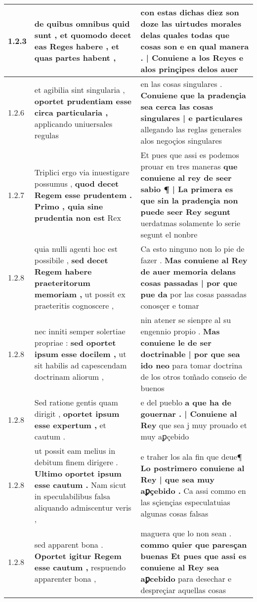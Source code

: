 \begin{tabular}{|p{1cm}|p{6.5cm}|p{6.5cm}|}
1.2.3 & de quibus omnibus quid sunt , \textbf{ et quomodo decet eas Reges habere , } et quas partes habent , & con estas dichas diez \textbf{ son doze las uirtudes morales delas quales todas que cosas son e en qual manera . | Conuiene a los Reyes } e alos prinçipes delos auer \\\hline
1.2.6 & et agibilia sint singularia , \textbf{ oportet prudentiam esse circa particularia , } applicando uniuersales regulas & en las cosas singulares . \textbf{ Conuiene que la pradençia sea cerca las cosas singulares | e particulares } allegando las reglas generales alos negoçios singulares \\\hline
1.2.7 & Triplici ergo via inuestigare possumus , \textbf{ quod decet Regem esse prudentem . Primo , quia sine prudentia non est } Rex & Et pues que assi es podemos prouar en tres maneras \textbf{ que conuiene al rey de seer sabio ¶ | La primera es que sin la pradençia non puede seer Rey segunt } uerdatmas solamente lo serie segunt el nonbre \\\hline
1.2.8 & quia nulli agenti hoc est possibile , \textbf{ sed decet Regem habere praeteritorum memoriam , } ut possit ex praeteritis cognoscere , & Ca esto ninguno non lo pie de fazer . \textbf{ Mas conuiene al Rey de auer memoria delans cosas passadas | por que pue da } por las cosas passadas conosçer e tomar \\\hline
1.2.8 & nec inniti semper solertiae propriae : \textbf{ sed oportet ipsum esse docilem , } ut sit habilis ad capescendam doctrinam aliorum , & nin atener se sienpre al su engennio propio . \textbf{ Mas conuiene le de ser doctrinable | por que sea ido neo } para tomar doctrina de los otros tom̃ado conseio de buenos \\\hline
1.2.8 & Sed ratione gentis quam dirigit , \textbf{ oportet ipsum esse expertum , } et cautum . & e del pueblo \textbf{ a que ha de gouernar . | Conuiene al Rey } que sea j muy prouado et muy aꝑçebido \\\hline
1.2.8 & ut possit eam melius in debitum finem dirigere . \textbf{ Ultimo oportet ipsum esse cautum . } Nam sicut in speculabilibus falsa aliquando admiscentur veris , & e traher los ala fin que deue¶ \textbf{ Lo postrimero conuiene al Rey | que sea muy aꝑçebido . } Ca assi commo en las sçiençias especulatuias algunas cosas falsas \\\hline
1.2.8 & sed apparent bona . \textbf{ Oportet igitur Regem esse cautum , } respuendo apparenter bona , & maguera que lo non sean . \textbf{ commo quier que paresçan buenas Et pues que assi es conuiene al Rey sea aꝑcebido } para desechar e despreçiar aquellas cosas \\\hline

\end{tabular}
